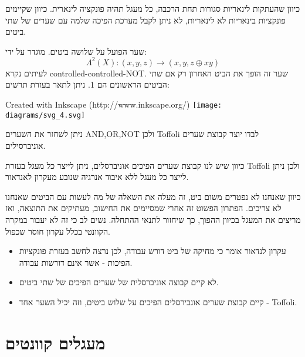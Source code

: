 \documentclass{tstextbook}
\begin{document}
\begin{corollary}
כיוון שהעתקות לינאריות סגורות תחת הרכבה, כל מעגל תהיה פונקציה לינארית. כיוון שקיימים פונקציות בינאריות לא לינאריות, לא ניתן לקבל מערכת הפיכה שלמה עם שערים של שתי ביטים.

\end{corollary}
\begin{definition}
שער הפועל על שלושה ביטים. מוגדר על ידי:
$$\Lambda^{2}(X):(x,y,z)\longrightarrow(x,y,z\oplus x y)$$
לעיתים נקרא controlled-controlled-NOT. שער זה הופך את הביט האחרון רק אם שתי הביטים הראשונים הם 1. ניתן לתאר בעזרת תרשים:

 Created with Inkscape (http://www.inkscape.org/) \texttt{[image: diagrams/svg\_4.svg]}
\end{definition}
\begin{proposition}
ניתן לשחזר את השערים AND,OR,NOT ולכן Toffoli לבדו יוצר קבוצת שערים אוניברסילים.

\end{proposition}
\begin{corollary}
כיוון שיש לנו קבוצת שערים הפיכים אוניברסלים, ניתן לייצר כל מעגל בעזרת Toffoli ולכן ניתן לייצר כל מעגל ללא איבוד אנרגיה שנובע מעקרון לאנדאור.

\end{corollary}
\begin{remark}
כיוון שאנחנו לא נפטרים משום ביט, זה מעלה את השאלה של מה לעשות עם הביטים שאנחנו לא צריכים. הפתרון הפשוט זה אחרי שמסיימים את החישוב, מעתיקים את התוצאה, ואז מריצים את המעגל בכיוון ההפוך, כך שיחזור לתנאי ההתחלה. נשים לב כי זה לא יעבור במקרה הקוונטי בכלל עקרון חוסר שכפול.

\end{remark}
\begin{summary}
  \begin{itemize}
    \item עקרון לנדאור אומר כי מחיקה של ביט דורש עבודה, לכן נרצה לחשב בעזרת פונקציות הפיכות - אשר אינם דורשות עבודה.
    \item לא קיים קבוצה אוניברסלית של שערים הפיכים של שתי ביטים.
    \item קיים קבוצת שערים אונבירסלים הפיכים על שלוש ביטים, וזה יכיל השער אחד - Toffoli.
  \end{itemize}
\end{summary}
\section{מעגלים קוונטים}
\end{document}
